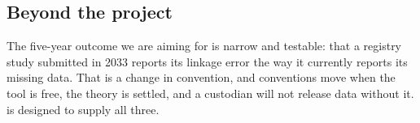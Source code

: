 \subsection{Beyond the project}

The five-year outcome we are aiming for is narrow and testable: that a registry study submitted in
2033 reports its linkage error the way it currently reports its missing data. That is a change in
convention, and conventions move when the tool is free, the theory is settled, and a custodian will
not release data without it. \proj{} is designed to supply all three.
